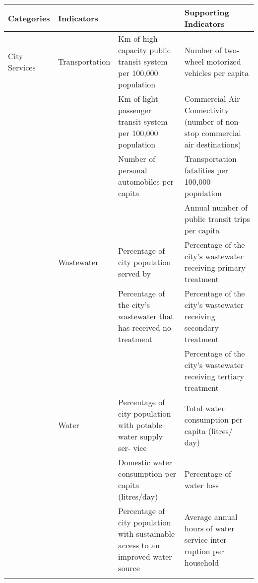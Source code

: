 \begin{landscape}
\begin{table}[th]
\begin{center}
\begin{tabular}{ >{\raggedright\arraybackslash}p{} >{\raggedright\arraybackslash}p{} >{\raggedright\arraybackslash}p{} >{\raggedright\arraybackslash}p{} } 
\hline
Categories & Indicators &  & Supporting Indicators \\
\hline
City Services & Transportation & Km of high capacity public transit system per 100,000 population & Number of two-wheel motorized vehicles per capita \\
  &  & Km of light passenger transit system per 100,000 population & Commercial Air Connectivity (number of non- stop commercial air destinations) \\
  &  & Number of personal automobiles per capita & Transportation fatalities per 100,000 population \\
  &  &  & Annual number of public transit trips per capita \linebreak \\
  & Wastewater & Percentage of city population served by & Percentage of the city’s wastewater receiving primary treatment \\
  &  & Percentage of the city’s wastewater that has received no treatment & Percentage of the city’s wastewater receiving secondary treatment \\
  &  &  & Percentage of the city’s wastewater receiving tertiary treatment \linebreak \\
  & Water & Percentage of city population with potable water supply ser- vice & Total water consumption per capita (litres/ day) \\
  &  & Domestic water consumption per capita (litres/day) & Percentage of water loss \\
  &  & Percentage of city population with sustainable access to an improved water source & Average annual hours of water service inter- ruption per household \\
\hline
\label{tbl:globalCityIndicatorsFacility2}
\end{tabular}
\end{center}
\end{table}


\end{landscape}
